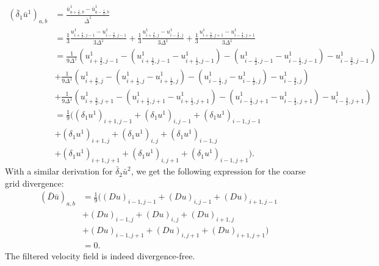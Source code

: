 \documentclass[preprint]{elsarticle}
\begin{document}
\begin{equation}
\begin{split}
    (\bar{\delta}_1 \bar{u}^1)_{a, b}
    & = \frac{\bar{u}^1_{a + \frac{1}{2}, b}
    - \bar{u}^1_{a - \frac{1}{2}, b}}{\bar{\Delta}^1} \\
    & = \tfrac{1}{3} \frac{u^1_{i + \frac{3}{2}, j - 1}
    - u^1_{i - \frac{3}{2}, j - 1}}{3 \Delta^1}
    + \tfrac{1}{3} \frac{u^1_{i + \frac{3}{2}, j}
    - u^1_{i - \frac{3}{2}, j}}{3 \Delta^1}
    + \tfrac{1}{3} \frac{u^1_{i + \frac{3}{2}, j + 1}
    - u^1_{i - \frac{3}{2}, j + 1}}{3 \Delta^1} \\
    & = \frac{1}{9 \Delta^1} \left( u^1_{i + \frac{3}{2}, j - 1}
    - (u^1_{i + \frac{1}{2}, j - 1} - u^1_{i + \frac{1}{2}, j - 1})
    - (u^1_{i - \frac{1}{2}, j - 1} - u^1_{i - \frac{1}{2}, j - 1})
    - u^1_{i - \frac{3}{2}, j - 1} \right) \\
    & + \frac{1}{9 \Delta^1} \left( u^1_{i + \frac{3}{2}, j}
    - (u^1_{i + \frac{1}{2}, j} - u^1_{i + \frac{1}{2}, j})
    - (u^1_{i - \frac{1}{2}, j} - u^1_{i - \frac{1}{2}, j})
    - u^1_{i - \frac{3}{2}, j} \right) \\
    & + \frac{1}{9 \Delta^1} \left( u^1_{i + \frac{3}{2}, j + 1}
    - (u^1_{i + \frac{1}{2}, j + 1} - u^1_{i + \frac{1}{2}, j + 1})
    - (u^1_{i - \frac{1}{2}, j + 1} - u^1_{i - \frac{1}{2}, j + 1})
    - u^1_{i - \frac{3}{2}, j + 1} \right) \\
    & = \frac{1}{9} \Big( (\delta_1 u^1)_{i + 1, j - 1}
    + (\delta_1 u^1)_{i, j - 1}
    + (\delta_1 u^1)_{i - 1, j - 1} \\
    & + (\delta_1 u^1)_{i + 1, j}
    + (\delta_1 u^1)_{i, j}
    + (\delta_1 u^1)_{i - 1, j} \\
    & + (\delta_1 u^1)_{i + 1, j + 1}
    + (\delta_1 u^1)_{i, j + 1}
    + (\delta_1 u^1)_{i - 1, j + 1} \Big).
\end{split}
\end{equation}
With a similar derivation for $\bar{\delta}_2 \bar{u}^2$, we get the following
expression for the coarse grid divergence:
\begin{equation}
\begin{split}
    (\bar{D} \bar{u})_{a, b} & = \frac{1}{9} \Big(
    (D u)_{i - 1, j - 1} + (D u)_{i, j - 1} + (D u)_{i + 1, j - 1} \\
    & + (D u)_{i - 1, j} + (D u)_{i, j} + (D u)_{i + 1, j} \\
    & + (D u)_{i - 1, j + 1} + (D u)_{i, j + 1} + (D u)_{i + 1, j + 1} \Big) \\
    & = 0.
\end{split}
\end{equation}
The filtered velocity field is indeed divergence-free.
\end{document}
